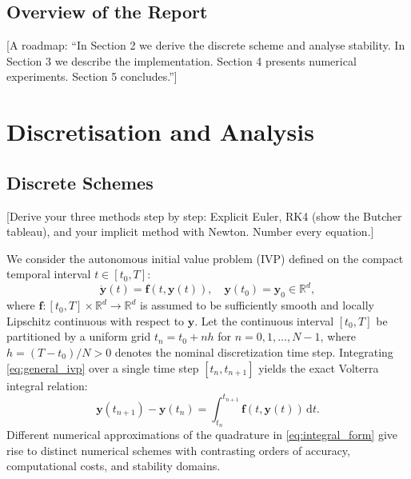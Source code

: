 \documentclass[11pt,a4paper]{article}
\theoremstyle{definition}
\theoremstyle{remark}
\begin{document}
\subsection{Overview of the Report}
[A roadmap: ``In Section 2 we derive the discrete scheme and analyse stability.
In Section 3 we describe the implementation. Section 4 presents numerical
experiments. Section 5 concludes.'']

\newpage
\section{Discretisation and Analysis}

\subsection{Discrete Schemes}
[Derive your three methods step by step: Explicit Euler, RK4 (show the Butcher
tableau), and your implicit method with Newton. Number every equation.]
\label{sec:discrete_schemes}

We consider the autonomous initial value problem (IVP) defined on the compact temporal interval $t \in [t_0, T]$:
\begin{equation}
\label{eq:general_ivp}
\dot{\mathbf{y}}(t) = \mathbf{f}(t, \mathbf{y}(t)), \quad \mathbf{y}(t_0) = \mathbf{y}_0 \in \mathbb{R}^d,
\end{equation}
where $\mathbf{f}: [t_0, T] \times \mathbb{R}^d \to \mathbb{R}^d$ is assumed to be sufficiently smooth and locally Lipschitz continuous with respect to $\mathbf{y}$. Let the continuous interval $[t_0, T]$ be partitioned by a uniform grid $t_n = t_0 + n h$ for $n = 0, 1, \dots, N-1$, where $h = (T - t_0)/N > 0$ denotes the nominal discretization time step. Integrating \eqref{eq:general_ivp} over a single time step $[t_n, t_{n+1}]$ yields the exact Volterra integral relation:
\begin{equation}
\label{eq:integral_form}
\mathbf{y}(t_{n+1}) - \mathbf{y}(t_n) = \int_{t_n}^{t_{n+1}} \mathbf{f}(t, \mathbf{y}(t)) \, \mathrm{d}t.
\end{equation}
Different numerical approximations of the quadrature in \eqref{eq:integral_form} give rise to distinct numerical schemes with contrasting orders of accuracy, computational costs, and stability domains.
\end{document}
